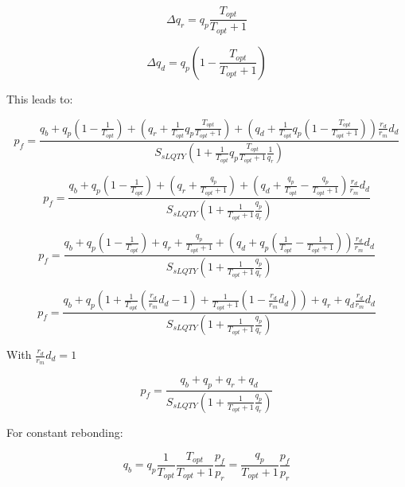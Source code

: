 \documentclass{article}
\begin{document}
\begin{equation}
\Delta q_{r} = q_{p} \frac{T_{opt}}{T_{opt}+1}
\end{equation}

\begin{equation}
\Delta q_{d} = q_{p} \left( 1- \frac{T_{opt}}{T_{opt}+1} \right)
\end{equation}

This leads to:

\[
p_{f} = \frac{q_{b}+q_{p} \left(1-\frac{1}{T_{opt}}\right)+\left(q_{r}+\frac{1}{T_{opt}} q_{p} \frac{T_{opt}}{T_{opt}+1}\right)+ \left(q_{d}+\frac{1}{T_{opt}} q_{p} \left( 1- \frac{T_{opt}}{T_{opt}+1}\right)\right)\frac{r_{d}}{r_{m}}d_{d}}{S_{sLQTY} \left( 1+\frac{1}{T_{opt}} q_{p} \frac{T_{opt}}{T_{opt}+1}\frac{1}{q_{r}} \right)}
\]

\[
p_{f} = \frac{q_{b}+q_{p} \left(1-\frac{1}{T_{opt}}\right)+\left(q_{r}+ \frac{q_{p}}{T_{opt}+1}\right)+ \left(q_{d}+\frac{q_{p}}{T_{opt}} - \frac{q_{p}}{T_{opt}+1}\right)\frac{r_{d}}{r_{m}}d_{d}}{S_{sLQTY} \left( 1+ \frac{1}{T_{opt}+1}\frac{q_{p}}{q_{r}} \right)}
\]

\[
p_{f} = \frac{q_{b}+q_{p}\left(1-\frac{1}{T_{opt}}\right)+q_{r}+ \frac{q_{p}}{T_{opt}+1}+\left(q_{d}+q_{p} \left( \frac{1}{T_{opt}}- \frac{1}{T_{opt}+1} \right)\right)\frac{r_{d}}{r_{m}}d_{d}}{S_{sLQTY}\left(1+  \frac{1}{T_{opt}+1}\frac{q_{p}}{q_{r}}\right)}
\]

\begin{equation}
  \label{eq:recursive_optimal_1}
p_{f} = \frac{q_{b}+q_{p} \left(1+\frac{1}{T_{opt}}\left(\frac{r_{d}}{r_{m}}d_{d}-1\right)+ \frac{1}{T_{opt}+1}\left( 1 - \frac{r_{d}}{r_{m}}d_{d} \right)\right)+q_{r}+q_{d}\frac{r_{d}}{r_{m}}d_{d}}{S_{sLQTY}\left(1+  \frac{1}{T_{opt}+1}\frac{q_{p}}{q_{r}}\right)}
\end{equation}

With $\frac{r_{d}}{r_{m}}d_{d}=1$

\begin{equation}
  \label{eq:recursive_optimal_2}
p_{f} = \frac{q_{b}+q_{p}+q_{r}+q_{d}}{S_{sLQTY}\left(1+  \frac{1}{T_{opt}+1}\frac{q_{p}}{q_{r}}\right)}
\end{equation}

For constant rebonding:

\begin{equation}
q_{b} = q_{p} \frac{1}{T_{opt}} \frac{T_{opt}}{T_{opt}+1}\frac{p_{f}}{p_{r}} = \frac{q_{p}}{T_{opt}+1}\frac{p_{f}}{p_{r}}
\end{equation}
\end{document}
